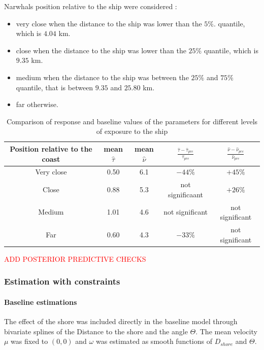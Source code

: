 \documentclass[11pt]{article}
\newcommand {\1}{\mathbb{1}}
\begin{document}
Narwhals position relative to the ship were considered :
\begin{itemize}
	\item very close when the distance to the ship was lower than the $5\%$. quantile, which is $4.04$ km.
	\item close when the distance to the ship was lower than the $25\%$ quantile, which is $9.35$ km.
	\item medium when the distance to the ship was between the $25\%$ and $75\%$ quantile, that is between $9.35$ and $25.80$ km.
	\item far otherwise.
\end{itemize}
\begin{table}[H]
	\centering
\begin{tabular}{|c|c|c|c|c|}
	\hline
	Position relative to the coast & mean $\hat{\tau}$  & mean $\hat{\nu}$ & $\frac{\hat{\tau}-\hat{\tau}_{pre}}{\tau_{pre}}$ & $\frac{\hat{\nu}-\hat{\nu}_{pre}}{\hat{\nu}_{pre}}$   \\
	\hline
	Very close & 0.50 & 6.1 & $-44 \%$ & $+45 \%$ \\
	\hline
	Close & 0.88 & 5.3 & not significaant & $+26\%$ \\
	\hline
	Medium&  1.01 &  4.6 &  not significant & not significant \\
	\hline
	Far &  0.60 & 4.3 & $-33\%$ & not significant \\
	\hline
\end{tabular}
\caption{Comparison of response and baseline values of the parameters for different levels of exposure to the ship}
\label{table: baseline vs response parameters comparison}
\end{table}

\textcolor{red}{ADD POSTERIOR PREDICTIVE CHECKS}

\subsubsection{Estimation with constraints}



\paragraph{Baseline estimations}

The effect of the shore was included directly in the baseline model through bivariate splines of the Distance to the shore and the angle $\Theta$.
The mean velocity $\mu$ was fixed to $(0,0)$ and $\omega$ was estimated as smooth functions of $D_{shore}$ and $\Theta$.
\end{document}

